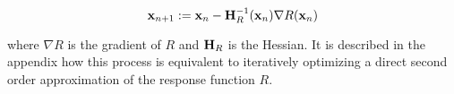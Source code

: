 \documentclass{article}
\newcommand{\vect}[1]{\textbf{\textrm{#1}}}
\begin{document}
\begin{equation} \label{updateruledog}
	\vect{x}_{n+1} := \vect{x}_n - \vect{H}_R^{-1}(\vect{x}_n)\nabla R(\vect{x}_n)
\end{equation}

where $\nabla R$ is the gradient of $R$ and $\vect{H}_R$ is the Hessian.
It is described in the appendix how this process is equivalent to iteratively optimizing a direct second order approximation of the response function $R$.

\begin{comment}
\section{A note on implementation}
Rather than being incorporated into mathematical formalism, the constraint on stimulus amplitude can also be implemented by re-normalizing the stimulus after every iteration of the optimizer. Geometrically, this has the effect of moving the new point $\vect{x}_{n+1}$ onto the sphere $\sum_n{x_n^2} = 1$ without changing the direction of the vector. \par
\hfill \newline
Additional, more general, constraints on the Newton optimization method regard properties of the Hessian matrix.
From \eqref{updateruledog} it can be seen that the response function Hessian must be invertible, that is

\begin{equation}
	\text{det}(\vect{H}_R) \neq 0
\end{equation}

In the case of \eqref{objmat}, it can be seen from \eqref{objhessian} that $\text{det}(\vect{H}_R) = 0$ if any term in the impulse-response kernel matrix $\hat{\vect{G}}$ is $0$. Thus invertibility can be guaranteed by adding a small number to all elements of the diagonal.

Further, if a maximum is required, the Hessian must be negative definite (all eigenvalues are $< 0$).
The first condition implies that the algorithm will fail if $\vect{x}$ falls on an inflection point, and the second condition is necessary for the search direction to point towards a maximum. 
Both of these conditions can be dealt with by re-intializing the optimization from a new starting point when one of the conditions is violated.
This method should be implemented even when the algorithm successfully terminates, as the search method does not guarantee that a global maximum will be found. 
\end{comment}
\end{document}
